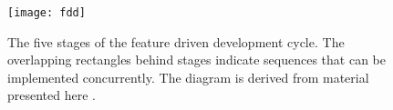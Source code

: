 \begin{figure}[h]
\centering
\texttt{[image: fdd]}
\caption{
    The five stages of the feature driven development cycle. 
    The overlapping rectangles behind stages indicate sequences
    that can be implemented concurrently. 
    The diagram is derived from material presented here \cite[p.~90]{fddjavacol}.
}
\label{fig:rasterdemo}
\end{figure}
